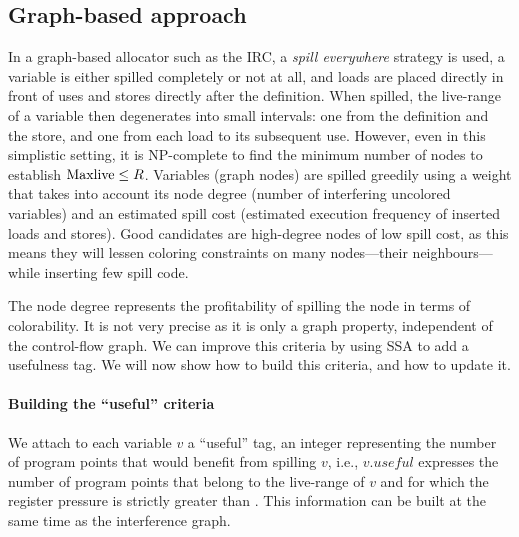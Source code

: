 {\subsection{Graph-based approach}


In a graph-based allocator such as the IRC, a \emph{spill everywhere} strategy is used, a variable is either spilled completely or not at all, and loads are placed directly in front of uses and stores directly after the definition.
When spilled, the live-range of a variable then degenerates into small intervals: one from the definition and the store, and one from each load to its subsequent use.
However, even in this simplistic setting, it is NP-complete to find the minimum number of nodes to establish $\mathrm{Maxlive}\le R$.
Variables (graph nodes) are spilled greedily using a weight that takes into account its node degree (number of interfering uncolored variables) and an estimated spill cost (estimated execution frequency of inserted loads and stores).
Good candidates are high-degree nodes of low spill cost, as this means they will lessen coloring constraints on many nodes---their neighbours---while inserting few spill code.

The node degree represents the profitability of spilling the node in terms of colorability.
It is not very precise as it is only a graph property, independent of the control-flow graph.
We can improve this criteria by using SSA to add a usefulness tag.
We will now show how to build this criteria, and how to update it.

\paragraph{Building the ``useful'' criteria}

We attach to each variable $v$ a ``useful'' tag, an integer representing the number of program points that would benefit from spilling $v$, i.e., $v.\textit{useful}$ expresses the number of program points that belong to the live-range of $v$ and for which the register pressure is strictly greater than \regs.
This information can be built at the same time as the interference graph.

}
